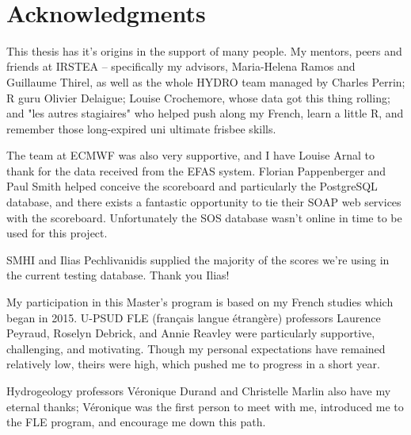 \documentclass[logos,parttoc,morelanguage=french,morelanguage=german,draft]{orsay-memoire}
\begin{document}
\noindent\hspace*{0.35\textwidth}\hrulefill\hspace*{0.35\textwidth}\\[-\bigskipamount]




\section*{Acknowledgments}
\vfill
This thesis has it's origins in the support of many people. My mentors, peers and friends at IRSTEA -- specifically my advisors, Maria-Helena Ramos and Guillaume Thirel, as well as the whole HYDRO team managed by Charles Perrin; R guru Olivier Delaigue; Louise Crochemore, whose data got this thing rolling; and "les autres stagiaires" who helped push along my French, learn a little R, and remember those long-expired uni ultimate frisbee skills.

The team at ECMWF was also very supportive, and I have Louise Arnal to thank for the data received from the EFAS system. Florian Pappenberger and Paul Smith helped conceive the scoreboard and particularly the PostgreSQL database, and there exists a fantastic opportunity to tie their SOAP web services with the scoreboard. Unfortunately the SOS database wasn't online in time to be used for this project.

SMHI and Ilias Pechlivanidis supplied the majority of the scores we're using in the current testing database. Thank you Ilias!

My participation in this Master's program is based on my French studies which began in 2015. U-PSUD FLE (français langue étrangère) professors Laurence Peyraud, Roselyn Debrick, and Annie Reavley were particularly supportive, challenging, and motivating. Though my personal expectations have remained relatively low, theirs were high, which pushed me to progress in a short year.

Hydrogeology professors Véronique Durand and Christelle Marlin also have my eternal thanks; Véronique was the first person to meet with me, introduced me to the FLE program, and encourage me down this path.
\end{document}
